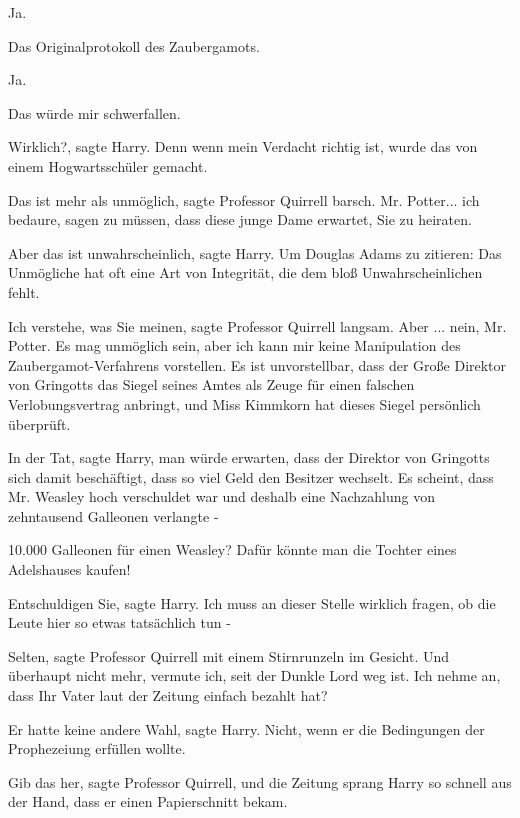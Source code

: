 \glqq{}Ja.\grqq{}

\glqq{}Das Originalprotokoll des Zaubergamots.\grqq{}

\glqq{}Ja.\grqq{}

\glqq{}Das würde mir schwerfallen.\grqq{}

\glqq{}Wirklich?\grqq{}, sagte Harry. \glqq{}Denn wenn mein Verdacht richtig
ist, wurde das von einem Hogwartsschüler gemacht.\grqq{}

\glqq{}Das ist mehr als unmöglich\grqq{}, sagte Professor Quirrell barsch.
\glqq{} Mr. Potter... ich bedaure, sagen zu müssen, dass diese junge Dame
erwartet, Sie zu heiraten.\grqq{}

\glqq{}Aber das ist unwahrscheinlich\grqq{}, sagte Harry. \glqq{}Um Douglas
Adams zu zitieren: Das Unmögliche hat oft eine Art von Integrität, die dem bloß
Unwahrscheinlichen fehlt.\grqq{}

\glqq{}Ich verstehe, was Sie meinen\grqq{}, sagte Professor Quirrell langsam.
\glqq{}Aber ... nein, Mr. Potter. Es mag unmöglich sein, aber ich kann mir keine
Manipulation des Zaubergamot-Verfahrens vorstellen. Es ist unvorstellbar, dass
der Große Direktor von Gringotts das Siegel seines Amtes als Zeuge für einen
falschen Verlobungsvertrag anbringt, und Miss Kimmkorn hat dieses Siegel
persönlich überprüft.\grqq{}

\glqq{}In der Tat\grqq{}, sagte Harry, \glqq{}man würde erwarten, dass der
Direktor von Gringotts sich damit beschäftigt, dass so viel Geld den Besitzer
wechselt. Es scheint, dass Mr. Weasley hoch verschuldet war und deshalb eine
Nachzahlung von zehntausend Galleonen verlangte -\grqq{}

\glqq{}10.000 Galleonen für einen Weasley? Dafür könnte man die Tochter eines
Adelshauses kaufen!\grqq{}

\glqq{}Entschuldigen Sie\grqq{}, sagte Harry. \glqq{}Ich muss an dieser Stelle
wirklich fragen, ob die Leute hier so etwas tatsächlich tun -\grqq{}

\glqq{}Selten\grqq{}, sagte Professor Quirrell mit einem Stirnrunzeln im
Gesicht. \glqq{}Und überhaupt nicht mehr, vermute ich, seit der Dunkle Lord weg
ist. Ich nehme an, dass Ihr Vater laut der Zeitung einfach bezahlt hat?\grqq{}

\glqq{}Er hatte keine andere Wahl\grqq{}, sagte Harry. \glqq{}Nicht, wenn er die
Bedingungen der Prophezeiung erfüllen wollte.\grqq{}

\glqq{}Gib das her\grqq{}, sagte Professor Quirrell, und die Zeitung sprang
Harry so schnell aus der Hand, dass er einen Papierschnitt bekam.

